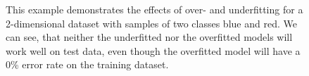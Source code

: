 \begin{figure}[ht]
  
  \begin{center}
    \end{center}
  
  \caption[Overfitting Example]{This example demonstrates the effects of over- and underfitting for a 2-dimensional dataset with samples of two classes blue and red. We can see, that neither the underfitted nor the overfitted models will work well on test data, even though the overfitted model will have a 0\% error rate on the training dataset.\footnotemark}
  \label{fig:Overfitting}
\end{figure}

